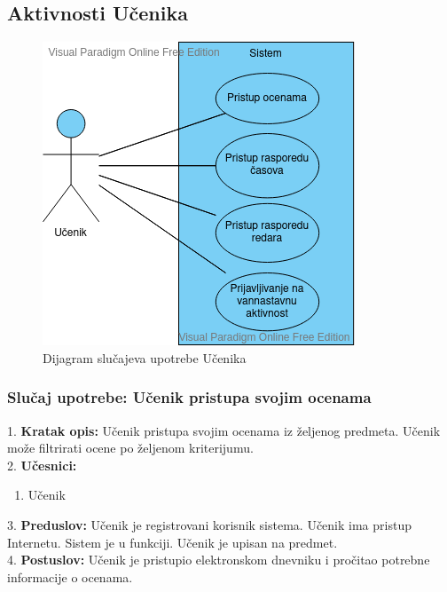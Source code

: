 \documentclass{article}
\begin{document}
\subsection{Aktivnosti Učenika}

\begin{figure} [!ht]
    \begin{center}
        \includegraphics[scale=0.6]{imgs/ucenik_use_case.png}
    \end{center}
\caption{Dijagram slučajeva upotrebe Učenika}
\end{figure}


\newpage
\subsubsection{Slučaj upotrebe: Učenik pristupa svojim ocenama} 
1. \textbf{Kratak opis:} Učenik pristupa svojim ocenama iz željenog predmeta. Učenik može filtrirati ocene po željenom kriterijumu. \\

2. \textbf{Učesnici:}
\begin{enumerate} [label=(\alph*)]
\item Učenik
\end{enumerate} 

3. \textbf{Preduslov:} Učenik je registrovani korisnik sistema. Učenik ima pristup Internetu. Sistem je u funkciji. Učenik je upisan na predmet. \\

4. \textbf{Postuslov:} Učenik je pristupio elektronskom dnevniku i pročitao potrebne informacije o ocenama.\\
\end{document}
